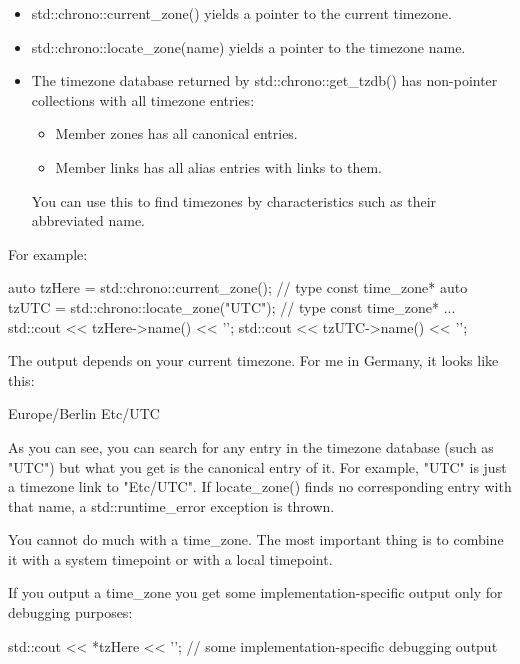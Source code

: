 \begin{itemize}
\item 
std::chrono::current\_zone() yields a pointer to the current timezone.

\item 
std::chrono::locate\_zone(name) yields a pointer to the timezone name.

\item 
The timezone database returned by std::chrono::get\_tzdb() has non-pointer collections with all timezone entries:

\begin{itemize}
\item 
Member zones has all canonical entries.

\item 
Member links has all alias entries with links to them.
\end{itemize}

You can use this to find timezones by characteristics such as their abbreviated name.
\end{itemize}

For example:

\begin{cpp}
auto tzHere = std::chrono::current_zone(); // type const time_zone*
auto tzUTC = std::chrono::locate_zone("UTC"); // type const time_zone*
...
std::cout << tzHere->name() << '\n';
std::cout << tzUTC->name() << '\n';
\end{cpp}

The output depends on your current timezone. For me in Germany, it looks like this:

\begin{shell}
Europe/Berlin
Etc/UTC
\end{shell}

As you can see, you can search for any entry in the timezone database (such as "UTC") but what you get is the canonical entry of it. For example, "UTC" is just a timezone link to "Etc/UTC". If locate\_zone() finds no corresponding entry with that name, a std::runtime\_error exception is thrown.

You cannot do much with a time\_zone. The most important thing is to combine it with a system timepoint or with a local timepoint.

If you output a time\_zone you get some implementation-specific output only for debugging purposes:

\begin{cpp}
std::cout << *tzHere << '\n'; // some implementation-specific debugging output
\end{cpp}

